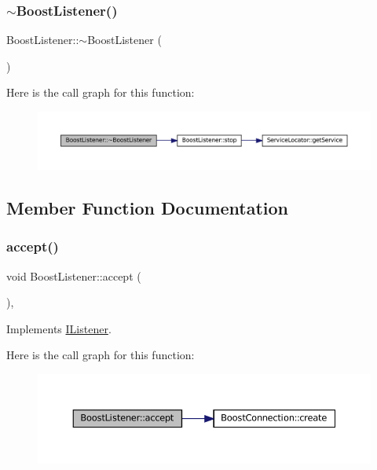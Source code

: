 \subsubsection{\texorpdfstring{$\sim$\+Boost\+Listener()}{~BoostListener()}}
{\footnotesize\ttfamily Boost\+Listener\+::$\sim$\+Boost\+Listener (\begin{DoxyParamCaption}{ }\end{DoxyParamCaption})\hspace{0.3cm}{\ttfamily [inline]}}

Here is the call graph for this function\+:
\nopagebreak
\begin{figure}[H]
\begin{center}
\leavevmode
\includegraphics[width=350pt]{classBoostListener_ad50826b92d445b7e101ca261741b43b1_cgraph}
\end{center}
\end{figure}


\subsection{Member Function Documentation}
\mbox{\label{classBoostListener_a8a2849f0e1c513750bc74cb9a2c0d428}} 
\subsubsection{\texorpdfstring{accept()}{accept()}}
{\footnotesize\ttfamily void Boost\+Listener\+::accept (\begin{DoxyParamCaption}{ }\end{DoxyParamCaption})\hspace{0.3cm}{\ttfamily [override]}, {\ttfamily [virtual]}}



Implements \mbox{\hyperlink{classIListener_a332f291fb10f7dadc223fe6c9a98a7cc}{I\+Listener}}.

Here is the call graph for this function\+:
\nopagebreak
\begin{figure}[H]
\begin{center}
\leavevmode
\includegraphics[width=350pt]{classBoostListener_a8a2849f0e1c513750bc74cb9a2c0d428_cgraph}
\end{center}
\end{figure}
\mbox{\label{classBoostListener_af83620fe2b6644903a6f631b8df2fd2d}} 
